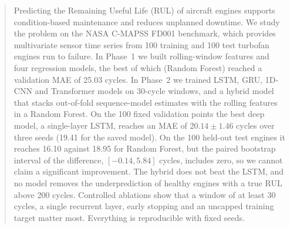 \begin{abstract}
Predicting the Remaining Useful Life (RUL) of aircraft engines supports
condition-based maintenance and reduces unplanned downtime.  We study the
problem on the NASA C-MAPSS FD001 benchmark, which provides multivariate sensor
time series from 100 training and 100 test turbofan engines run to failure.
In Phase~1 we built rolling-window features and four regression models,
the best of which (Random Forest) reached a validation MAE of 25.03 cycles.
In Phase~2 we trained LSTM, GRU, 1D-CNN and Transformer models on 30-cycle
windows, and a hybrid model that stacks out-of-fold sequence-model
estimates with the rolling features in a Random Forest.  On the 100 fixed
validation points the best deep model, a single-layer LSTM, reaches an MAE of
$20.14\pm1.46$ cycles over three seeds (19.41 for the saved model).  On the
100 held-out test engines it reaches 16.10 against 18.95 for Random Forest,
but the paired bootstrap interval of the difference, $[-0.14, 5.84]$ cycles,
includes zero, so we cannot claim a significant improvement.  The hybrid
does not beat the LSTM, and no model removes the underprediction of
healthy engines with a true RUL above 200 cycles.  Controlled ablations show that a window of at least 30 cycles, a
single recurrent layer, early stopping and an uncapped training target matter
most.  Everything is reproducible with fixed seeds.
\end{abstract}
